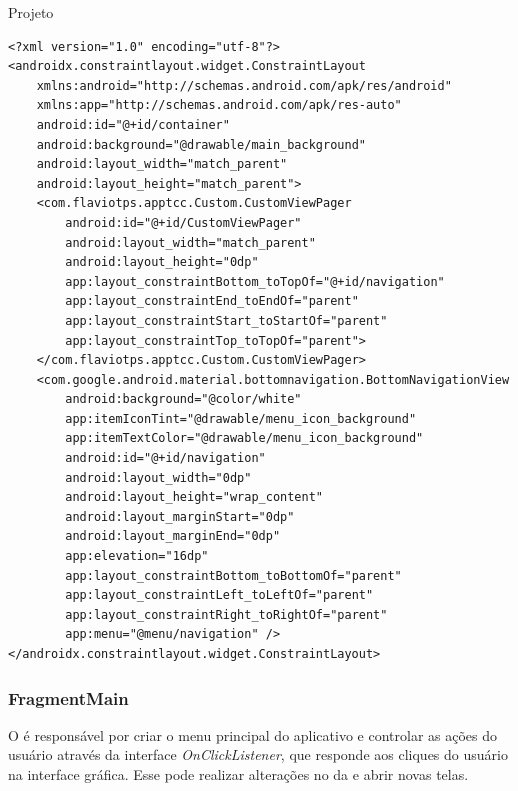 \documentclass[
	12pt,				%
	openright,			%
	twoside,			%
	a4paper,			%
	english,			%
	french,				%
	spanish,			%
	brazil				%
	]{abntex2}
\begin{document}
\begin{chapter}{Projeto}
\newpage
\begin{lstlisting}[numbers=none,
basicstyle=\small,
caption={Tela Principal.xml},
title={Tela Principal.xml},
label={activity_main.xml}]
<?xml version="1.0" encoding="utf-8"?>
<androidx.constraintlayout.widget.ConstraintLayout
    xmlns:android="http://schemas.android.com/apk/res/android"
    xmlns:app="http://schemas.android.com/apk/res-auto"
    android:id="@+id/container"
    android:background="@drawable/main_background"
    android:layout_width="match_parent"
    android:layout_height="match_parent">
    <com.flaviotps.apptcc.Custom.CustomViewPager
        android:id="@+id/CustomViewPager"
        android:layout_width="match_parent"
        android:layout_height="0dp"
        app:layout_constraintBottom_toTopOf="@+id/navigation"
        app:layout_constraintEnd_toEndOf="parent"
        app:layout_constraintStart_toStartOf="parent"
        app:layout_constraintTop_toTopOf="parent">
    </com.flaviotps.apptcc.Custom.CustomViewPager>
    <com.google.android.material.bottomnavigation.BottomNavigationView
        android:background="@color/white"
        app:itemIconTint="@drawable/menu_icon_background"
        app:itemTextColor="@drawable/menu_icon_background"
        android:id="@+id/navigation"
        android:layout_width="0dp"
        android:layout_height="wrap_content"
        android:layout_marginStart="0dp"
        android:layout_marginEnd="0dp"
        app:elevation="16dp"
        app:layout_constraintBottom_toBottomOf="parent"
        app:layout_constraintLeft_toLeftOf="parent"
        app:layout_constraintRight_toRightOf="parent"
        app:menu="@menu/navigation" />
</androidx.constraintlayout.widget.ConstraintLayout>
\end{lstlisting}

\newpage
\subsubsection{FragmentMain} \label{main_fragment}
O  é responsável por criar o menu principal do aplicativo e controlar as ações do usuário através da interface \textit{OnClickListener}, que responde aos cliques do usuário na interface gráfica. Esse  pode realizar alterações no  da  e abrir novas telas.


\end{chapter}
\end{document}
